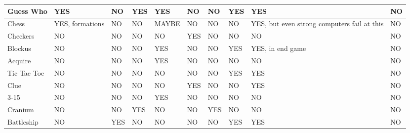 \documentclass{acm_proc_article-sp}
\begin{document}
\begin{sidewaystable}[htbp]
\begin{tabular}{|p{2cm}||p{1.5cm}|p{2.5cm}|p{2.5cm}|p{2.7cm}|p{2cm}|p{1.5cm}|p{2cm}|p{4.2cm}|p{1.5cm}|}
    Guess Who 
      & \cellcolor{blue!25}YES 
      & NO 
      & \cellcolor{blue!25}YES 
      & \cellcolor{blue!25}YES 
      & NO 
      & NO 
      & \cellcolor{blue!25}YES 
      & \cellcolor{blue!25}YES 
      & NO \\ \hline

    Chess 
      & \cellcolor{blue!25}YES, formations 
      & NO 
      & NO 
      & MAYBE 
      & NO 
      & NO 
      & NO 
      & \cellcolor{blue!25}YES, but even strong computers fail at this 
      & NO \\ \hline

    Checkers 
      & NO 
      & NO 
      & NO 
      & NO 
      & \cellcolor{blue!25}YES 
      & NO 
      & NO 
      & NO 
      & NO \\ \hline

    Blockus 
      & NO 
      & NO 
      & NO 
      & \cellcolor{blue!25}YES 
      & NO 
      & NO 
      & \cellcolor{blue!25}YES 
      & \cellcolor{blue!25}YES, in end game 
      & NO \\ \hline

    Acquire 
      & NO 
      & NO 
      & NO 
      & \cellcolor{blue!25}YES 
      & NO 
      & NO 
      & NO 
      & NO 
      & NO \\ \hline

    Tic Tac Toe
      & NO 
      & NO 
      & NO 
      & NO 
      & NO 
      & NO 
      & \cellcolor{blue!25}YES 
      & \cellcolor{blue!25}YES 
      & NO \\ \hline

    Clue
      & NO 
      & NO 
      & NO 
      & NO 
      & \cellcolor{blue!25}YES 
      & NO 
      & NO 
      & \cellcolor{blue!25}YES 
      & NO \\ \hline

    3-15
      & NO 
      & NO 
      & NO 
      & \cellcolor{blue!25}YES 
      & NO 
      & NO 
      & NO 
      & NO 
      & NO \\ \hline

    Cranium
      & NO 
      & NO 
      & \cellcolor{blue!25}YES 
      & NO 
      & NO 
      & \cellcolor{blue!25}YES 
      & NO 
      & NO 
      & NO \\ \hline

    Battleship 
      & NO 
      & \cellcolor{blue!25}YES 
      & NO 
      & NO 
      & NO 
      & NO 
      & \cellcolor{blue!25}YES 
      & \cellcolor{blue!25}YES 
      & NO \\ \hline


\end{tabular}
\end{sidewaystable}
\end{document}
